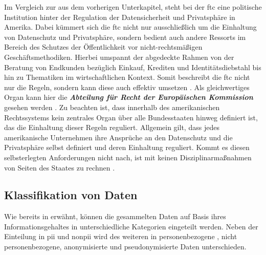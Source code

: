 Im Vergleich zur  aus dem vorherigen Unterkapitel, steht bei der \acl{ftc} eine politische Institution hinter der Regulation der Datensicherheit und Privatsphäre in Amerika. Dabei kümmert sich die \ac{ftc} nicht nur ausschließlich um die Einhaltung von Datenschutz und Privatsphäre, sondern bedient auch andere Ressorts im Bereich des Schutzes der Öffentlichkeit vor nicht-rechtsmäßigen Geschäftsmethodiken. Hierbei umspannt der abgedeckte Rahmen von der Beratung von Endkunden bezüglich Einkauf, Krediten und Identitätsdiebstahl bis hin zu Thematiken im wirtschaftlichen Kontext. Somit beschreibt die \ac{ftc} nicht nur die Regeln, sondern kann diese auch effektiv umsetzen \cite{FTC}. Als gleichwertiges Organ kann hier die \textbf{\textit{Abteilung für Recht der Europäischen Kommission}} gesehen werden \cite{FTCEU}.
Zu beachten ist, dass innerhalb des amerikanischen Rechtssystems kein zentrales Organ über alle Bundesstaaten hinweg definiert ist, das die Einhaltung dieser Regeln reguliert. Allgemein gilt, dass jedes amerikanische Unternehmen ihre Ansprüche an den Datenschutz und die Privatsphäre selbst definiert und deren Einhaltung reguliert. Kommt es diesen selbsterlegten Anforderungen nicht nach, ist mit keinen Disziplinarmaßnahmen von Seiten des Staates zu rechnen \cite{DatenschutzOrg2022}.

\subsection{Klassifikation von Daten}
\label{sec:Grundlagen:ssec:Klassifikation von Daten}

Wie bereits in  erwähnt, können die gesammelten Daten auf Basis ihres Informationsgehaltes in unterschiedliche Kategorien eingeteilt werden. Neben der Einteilung in \ac{pii} und \ac{nonpii} wird des weiteren in personenbezogene , nicht personenbezogene, anonymisierte und pseudonymisierte Daten unterschieden.

